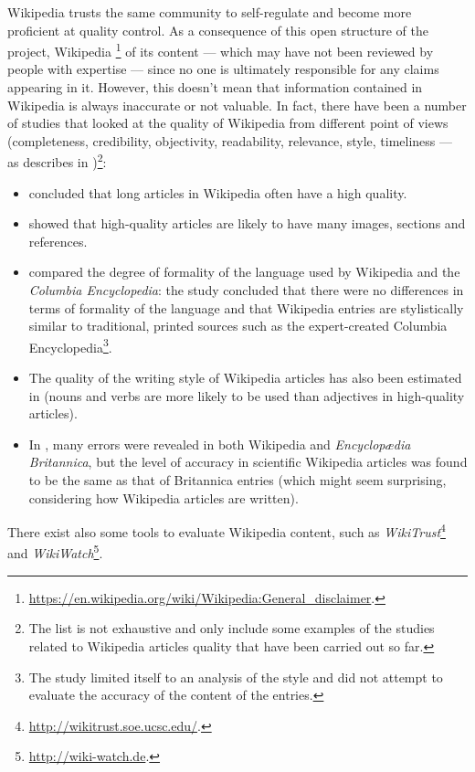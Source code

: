         Wikipedia trusts the same community to self-regulate and become more proficient at quality control. As a consequence of this open structure of the project, Wikipedia \footnote{\url{https://en.wikipedia.org/wiki/Wikipedia:General_disclaimer}.} of its content --- which may have not been reviewed by people with expertise --- since no one is ultimately responsible for any claims appearing in it. However, this doesn't mean that information contained in Wikipedia is always inaccurate or not valuable. In fact, there have been a number of studies that looked at the quality of Wikipedia from different point of views (completeness, credibility, objectivity, readability, relevance, style, timeliness --- as \citeauthor{LewoniewskiMeasures} describes in \cite{LewoniewskiMeasures})\footnote{The list is not exhaustive and only include some examples of the studies related to Wikipedia articles quality that have been carried out so far.}:
        \begin{itemize}
            \item \cite{Blumenstock} concluded that long articles in Wikipedia often have a high quality.
            \item \cite{LewoniewskiQuality} showed that high-quality articles are likely to have many images, sections and references.
            \item \cite{Emigh} compared the degree of formality of the language used by Wikipedia and the \emph{Columbia Encyclopedia}: the study concluded that there were no differences in terms of formality of the language and that Wikipedia entries are stylistically similar to traditional, printed sources such as the expert-created Columbia Encyclopedia\footnote{The study limited itself to an analysis of the style and did not attempt to evaluate the accuracy of the content of the entries.}.
            \item The quality of the writing style of Wikipedia articles has also been estimated in \cite{Xu} (nouns and verbs are more likely to be used than adjectives in high-quality articles).
            \item In \cite{Giles}, many errors were revealed in both Wikipedia and \emph{Encyclop{\ae}dia Britannica}, but the level of accuracy in scientific Wikipedia articles was found to be the same as that of Britannica entries (which might seem surprising, considering how Wikipedia articles are written).
        \end{itemize}
        There exist also some tools to evaluate Wikipedia content, such as \emph{WikiTrust}\footnote{\url{http://wikitrust.soe.ucsc.edu/}.} and \emph{WikiWatch}\footnote{\url{http://wiki-watch.de}.}.
        
